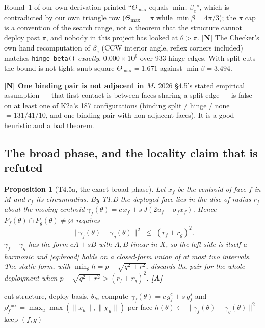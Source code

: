 \documentclass[11pt,a4paper]{article}
\newtheorem{proposition}[theorem]{Proposition}
\theoremstyle{definition}
\newcommand{\Tmax}{\Theta_{\max}}
\newcommand{\file}[1]{\texttt{\small #1}}
\begin{document}
\noindent Round~1 of our own derivation printed ``$\Tmax$ equals $\min_e\beta_e$'', which is
contradicted by our own triangle row ($\Tmax=\pi$ while $\min\beta=4\pi/3$); the $\pi$ cap is
a convention of the search range, not a theorem that the structure cannot deploy past $\pi$,
and nobody in this project has looked at $\theta>\pi$.
\textbf{[N]} The Checker's own hand recomputation of $\beta_e$ (CCW interior angle, reflex
corners included) matches \file{hinge\_beta()} \emph{exactly}, $0.000\times10^{0}$ over 933
hinge edges. With split cuts the bound is not tight: snub square $\Tmax=1.671$ against
$\min\beta=3.494$.

\textbf{[N] One binding pair is not adjacent in $M$.} 2026 §4.5's stated empirical assumption
--- that first contact is between faces sharing a split edge --- is false on at least one of
K2a's 187 configurations (binding split / hinge / none $=131/41/10$, and one binding pair with
non-adjacent faces). It is a good heuristic and a bad theorem.

\subsection{The broad phase, and the locality claim that is refuted}

\begin{proposition}[T4.5a, the exact broad phase]
Let $\bar{x}_f$ be the centroid of face $f$ in $M$ and $r_f$ its circumradius. By T1.D the
deployed face lies in the disc of radius $r_f$ about the \emph{moving centroid}
$\gamma_f(\theta)=c\,\bar{x}_f+s\,J(2u_f-\sigma_f\bar{x}_f)$. Hence
$P_f(\theta)\cap P_g(\theta)\ne\varnothing$ requires
\begin{equation}
\|\gamma_f(\theta)-\gamma_g(\theta)\|^2 \;\le\; (r_f+r_g)^2 .
\label{eq:broad}
\end{equation}
$\gamma_f-\gamma_g$ has the form $cA+sB$ with $A,B$ linear in $X$, so the left side is itself
a harmonic and \eqref{eq:broad} holds on a closed-form union of at most two intervals. The
static form, with $\min_\theta h = p-\sqrt{q^2+r^2}$, discards the pair for the whole
deployment when $p-\sqrt{q^2+r^2} > (r_f+r_g)^2$. \textbf{[A]}
\end{proposition}

\begin{algorithm}[t]
\caption{Broad phase --- \file{method/contact.jl::candidate\_pairs}}
\label{alg:broad}
\begin{algorithmic}[1]
\Require cut structure, deploy basis, $\theta_{hi}$
\State compute $\gamma_f(\theta)=c\,g^c_f+s\,g^s_f$ and $\rho^{\max}_f=\max_u\max(\|x_u\|,\|\chi_u\|)$ per face
  \State $h(\theta)\gets\|\gamma_f(\theta)-\gamma_g(\theta)\|^2$ 
    \State keep $(f,g)$
  \EndIf
\EndFor
\end{algorithmic}
\end{algorithm}
\end{document}
